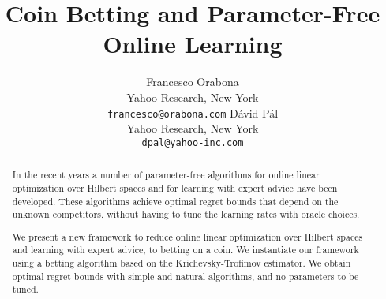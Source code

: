 \documentclass{article}
\author{
  Francesco Orabona\\
  Yahoo Research, New York\\
  \texttt{francesco@orabona.com}
  \And
  D\'avid P\'al\\
  Yahoo Research, New York\\
  \texttt{dpal@yahoo-inc.com}
}
\title{Coin Betting and Parameter-Free Online Learning}
\begin{document}
\maketitle

\begin{abstract}
In the recent years a number of parameter-free algorithms for online linear
optimization over Hilbert spaces and for learning with expert advice have been
developed. These algorithms achieve optimal regret bounds that depend on the unknown competitors, without having to tune the learning rates with oracle choices.

We present a new framework to reduce online linear optimization over Hilbert spaces and learning with expert advice, to betting on a coin. We instantiate our framework using a betting algorithm based on the Krichevsky-Trofimov estimator.
We obtain optimal regret bounds with simple and natural algorithms, and no parameters to be tuned.
\end{abstract}












\begin{small}
\newpage
\setlength{\bibsep}{0pt}


\end{small}

\appendix





\end{document}

